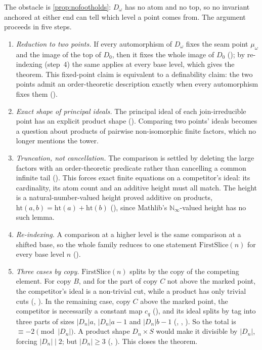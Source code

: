 \documentclass[11pt]{amsart}
\theoremstyle{plain}
\theoremstyle{definition}
\newcommand{\cst}[1]{c_{#1}}
\newcommand{\Dc}{D_\omega}
\begin{document}
The obstacle is \cref{prop:nofootholds}: $\Dc$ has no atom and no top, so no
invariant anchored at either end can tell which level a point comes from. The
argument proceeds in five steps.

\begin{enumerate}[label=\textbf{\arabic*.},leftmargin=2em]
\item \emph{Reduction to two points.} If every automorphism of $\Dc$ fixes the
  seam point $\mu_\omega$ and the image of the top of $D_0$, then it fixes the
  whole image of $D_0$ (); by re-indexing (step~4) the
  same applies at every base level, which gives the theorem. This fixed-point claim is equivalent to a
  definability claim: the two points admit an order-theoretic description
  exactly when every automorphism fixes them ().
\item \emph{Exact shape of principal ideals.} The principal ideal of each
  join-irreducible point has an explicit product shape
  (). Comparing two points' ideals becomes a
  question about products of pairwise non-isomorphic finite factors, which no
  longer mentions the tower.
\item \emph{Truncation, not cancellation.} The comparison is settled by deleting
  the large factors with an order-theoretic predicate rather than cancelling a
  common infinite tail (). This forces exact finite equations
  on a competitor's ideal: its cardinality, its atom count and an additive
  height must all match. The height is a natural-number-valued height proved
  additive on products, $\mathrm{ht}(a,b)=\mathrm{ht}(a)+\mathrm{ht}(b)$
  (), since Mathlib's $\mathbb N_\infty$-valued height has no such
  lemma.
\item \emph{Re-indexing.} A comparison at a higher level is the same
  comparison at a shifted base, so the whole family reduces to one statement
  $\mathrm{FirstSlice}(n)$ for every base level $n$ ().
\item \emph{Three cases by copy.} $\mathrm{FirstSlice}(n)$ splits by the copy
  of the competing element. For copy $B$, and for the part of copy $C$ not above
  the marked point, the competitor's ideal is a non-trivial cut, while a
  product has only trivial cuts (, ).
  In the remaining case, copy $C$ above the marked point, the competitor is
  necessarily a constant map $\cst q$ (), and
  its ideal splits by tag into three parts of sizes $|D_n|a$, $|D_n|a-1$ and
  $|D_n|b-1$ (, ,
  ). So the total is $\equiv-2\pmod{|D_n|}$. A
  product shape $D_n\times S$ would make it divisible by $|D_n|$, forcing
  $|D_n|\mid2$; but $|D_n|\ge3$ (,
  ). This closes the theorem.
\end{enumerate}
\end{document}
